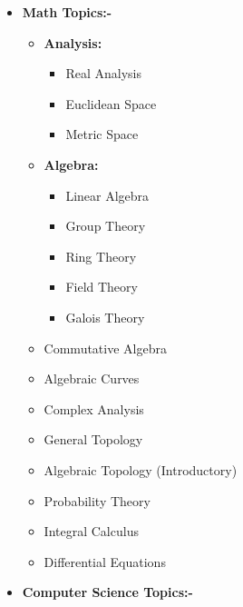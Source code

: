 \documentclass[10pt,a4paper,sans,colorlinks]{moderncv}        %
\begin{document}
\begin{itemize}
	\item 	\textbf{Math Topics:-}
	      \begin{itemize}
\item \textbf{Analysis:}
		      \begin{multicols}{3}
			       \begin{itemize}
				      \item Real Analysis
				      \item Euclidean Space
				      \item Metric Space
			      \end{itemize}
		      \end{multicols}
			      \item \textbf{Algebra:}\begin{multicols}{3}
			     	 \begin{itemize}
			     		\item Linear Algebra
			     		\item Group Theory
			     		\item Ring Theory
			     		\item Field Theory
			     		\item Galois Theory
			     		
			     	\end{itemize}
			     \end{multicols}
			     \item Commutative Algebra
			     \item Algebraic Curves
			      \item Complex Analysis
			     
			      \item General Topology
			      \item Algebraic Topology (Introductory)
			      \item Probability Theory
			      \item Integral Calculus
			      \item Differential Equations
	      \end{itemize}
      \pagebreak
	\item \textbf{Computer Science Topics:-}
	      \begin{itemize}



\end{itemize}
\end{itemize}
\end{document}
